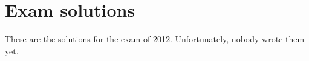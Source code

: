 \documentclass[main]{subfiles}
\begin{document}

\section{Exam solutions}
These are the solutions for the exam of 2012. Unfortunately, nobody wrote them yet.
\end{document}
